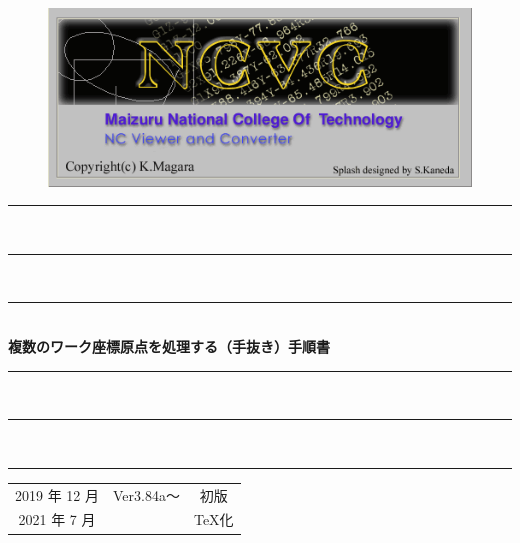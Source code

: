 
\vspace*{4zh}
\begin{figure}[H]
\centering
\includegraphics[scale=1.2]{logo.png}
\end{figure}

\vspace*{3zh}
\begin{center}
    \rule{12cm}{0.2zw}\\[-0.5zh]
    \rule{11cm}{0.1zw}\\[-0.5zh]
    \rule{10cm}{0.05zw}\\[1zh]
    {\Large \textbf{複数のワーク座標原点を処理する}}\textbf{（手抜き）}{\Large \textbf{手順書}}\\
    \rule{10cm}{0.05zw}\\[-0.5zh]
    \rule{11cm}{0.1zw}\\[-0.5zh]
    \rule{12cm}{0.2zw}

    \vspace*{7cm}
    \begin{table}[H]
        \centering
        \begin{tabular}{ccc}
            2019 年 12 月 & Ver3.84a～ & 初版\\
            2021 年 7 月  & & \TeX 化
        \end{tabular}
    \end{table}
\end{center}
